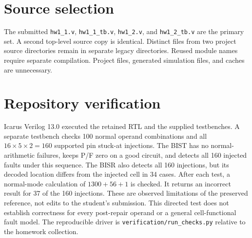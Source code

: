 \documentclass[11pt,a4paper]{article}
\newcommand{\bits}[1]{\texttt{#1}}
\begin{document}
\section{Source selection}
The submitted \bits{hw1\_1.v}, \bits{hw1\_1\_tb.v}, \bits{hw1\_2.v}, and \bits{hw1\_2\_tb.v} are the primary set. A second top-level source copy is identical. Distinct files from two project source directories remain in separate legacy directories. Reused module names require separate compilation. Project files, generated simulation files, and caches are unnecessary.
\section{Repository verification}
Icarus Verilog 13.0 executed the retained RTL and the supplied testbenches. A separate testbench checks 100 normal operand combinations and all $16\times5\times2=160$ supported pin stuck-at injections. The BIST has no normal-arithmetic failures, keeps P/F zero on a good circuit, and detects all 160 injected faults under this sequence.
The BISR also detects all 160 injections, but its decoded location differs from the injected cell in 34 cases. After each test, a normal-mode calculation of $1300+56+1$ is checked. It returns an incorrect result for 37 of the 160 injections. These are observed limitations of the preserved reference, not edits to the student's submission. This directed test does not establish correctness for every post-repair operand or a general cell-functional fault model. The reproducible driver is \bits{verification/run\_checks.py} relative to the homework collection.
\end{document}
